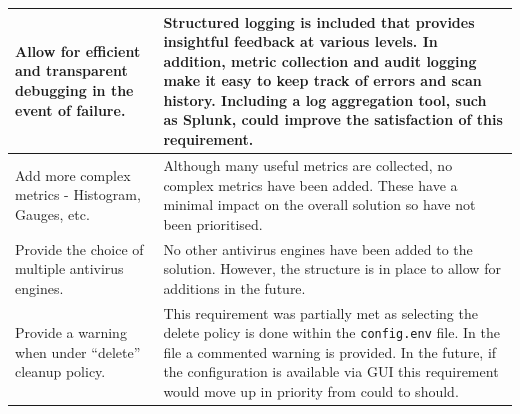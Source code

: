 \documentclass[12pt, conference, final, a4paper, onecolumn, compsoc]{IEEEtran}
\begin{document}
\begin{table}[H]
\begin{tabular}{|p{}|p{}|}
  \\ \hline
    Allow for efficient and transparent debugging in the event of failure. & Structured
    logging is included that provides insightful feedback at various levels. In
                                                                             addition,
    metric collection and audit logging make it easy to keep track of errors and
    scan history. Including a log aggregation tool, such as Splunk, could
                                                                             improve
                                                                             the
    satisfaction of this requirement. \\ \hline

    Add more complex metrics - Histogram, Gauges, etc. & Although many useful
                                                        metrics are collected,
                                                        no complex metrics have
                                                        been added. These have a
    minimal impact on the overall solution so have not been prioritised. \\ \hline \hline
    Provide the choice of multiple antivirus engines. & No other antivirus
                                                       engines have been added
                                                       to the solution. However,
    the structure is in place to allow for additions in the future.\\ \hline
    Provide a warning when under ``delete'' cleanup policy. & This requirement
                                                              was partially met
                                                              as selecting the
                                                              delete policy is
                                                              done within the
                                                              \texttt{config.env}
    file. In the file a commented warning is provided. In the future, if the
                                                              configuration is
                                                              available via GUI
                                                              this requirement
                                                              would move up in
                                                              priority from
                                                              could to should. \\ \hline

\end{tabular}
\end{table}
\end{document}
